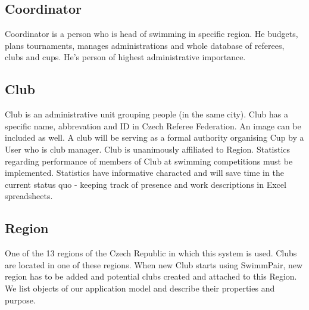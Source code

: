 \subsection*{Coordinator}
Coordinator is a person who is head of swimming in specific region. He budgets, plans tournaments, manages administrations and whole database of referees, clubs and cups. He's person of highest administrative importance.
\subsection*{Club}
\par
Club is an administrative unit grouping people (in the same city). Club has a specific name, abbrevation and ID in Czech Referee Federation. An image can be included as well. A club will be serving as a formal authority organising Cup by a User who is club manager. Club is unanimously affiliated to Region. Statistics regarding performance of members of Club at swimming competitions must be implemented. Statistics have informative characted and will save time in the current status quo - keeping track of presence and work descriptions in Excel spreadsheets.
\subsection*{Region}
One of the 13 regions of the Czech Republic in which this system is used. Clubs are located in one of these regions. When new Club starts using SwimmPair, new region has to be added and potential clubs created and attached to this Region. 
We list objects of our application model and describe their properties and purpose. 
